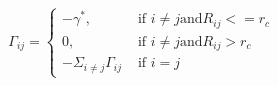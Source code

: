 \documentclass[]{article}
\begin{document}
\Huge %













\[\Gamma_{ij} =
\begin{cases}
-\gamma^{*}, &\text{ if } i\neq j \text{and} R_{ij} <= r_{c} \\
0, &\text{ if } i\neq j \text{and} R_{ij} > r_{c} \\
-\Sigma_{i\neq j} \Gamma_{ij} &\text { if } i=j
\end{cases}
\]
\end{document}
